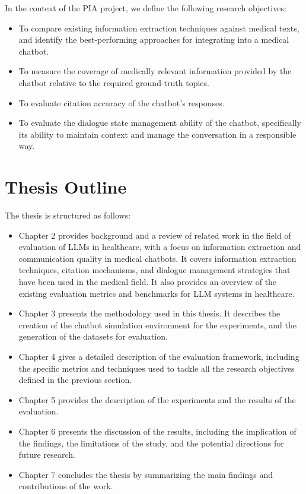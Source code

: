 In the context of the PIA project, we define the following research objectives:
\begin{itemize}
    \item To compare existing information extraction techniques against medical texts, and identify the best-performing approaches for integrating into a medical chatbot.
    \item To measure the coverage of medically relevant information provided by the chatbot relative to the required ground-truth topics.
    \item To evaluate citation accuracy of the chatbot's responses.
    \item To evaluate the dialogue state management ability of the chatbot, specifically its ability to maintain context and manage the conversation in a responsible way.
\end{itemize}

\section{Thesis Outline}

The thesis is structured as follows:
\begin{itemize}
    \item Chapter 2 provides background and a review of related work in the field of evaluation of LLMs in healthcare, with a focus on information extraction and communication quality in medical chatbots. It covers information extraction techniques, citation mechanisms, and dialogue management strategies that have been used in the medical field. It also provides an overview of the existing evaluation metrics and benchmarks for LLM systems in healthcare.
    \item Chapter 3 presents the methodology used in this thesis. It describes the creation of the chatbot simulation environment for the experiments, and the generation of the datasets for evaluation.
    \item Chapter 4 gives a detailed description of the evaluation framework, including the specific metrics and techniques used to tackle all the research objectives defined in the previous section.
    \item Chapter 5 provides the description of the experiments and the results of the evaluation.
    \item Chapter 6 presents the discussion of the results, including the implication of the findings, the limitations of the study, and the potential directions for future research.
    \item Chapter 7 concludes the thesis by summarizing the main findings and contributions of the work.
\end{itemize}